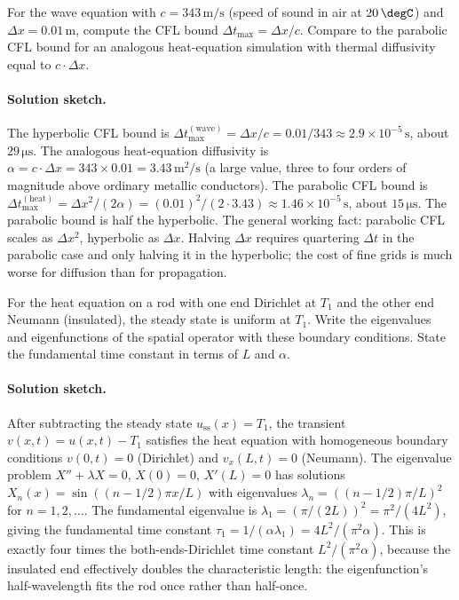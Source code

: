 \begin{exercise}
For the wave equation with $c = 343\,\si{\meter\per\second}$
(speed of sound in air at $20\,\degC$) and $\Delta x = 0.01\,\si
{\meter}$, compute the CFL bound $\Delta t_{\max} = \Delta x/c$.
Compare to the parabolic CFL bound for an analogous heat-equation
simulation with thermal diffusivity equal to $c \cdot \Delta x$.

\paragraph{Solution sketch.}
The hyperbolic CFL bound is $\Delta t_{\max}^{(\text{wave})} =
\Delta x / c = 0.01/343 \approx 2.9 \times 10^{-5}\,\si{\second}$,
about $29\,\si{\micro\second}$. The analogous heat-equation
diffusivity is $\alpha = c \cdot \Delta x = 343 \times 0.01 =
3.43\,\si{\meter\squared\per\second}$ (a large value, three to
four orders of magnitude above ordinary metallic conductors).
The parabolic CFL bound is $\Delta t_{\max}^{(\text{heat})} =
\Delta x^{2}/(2\alpha) = (0.01)^{2}/(2 \cdot 3.43) \approx
1.46 \times 10^{-5}\,\si{\second}$, about $15\,\si{\micro\second}$.
The parabolic bound is half the hyperbolic. The general working
fact: parabolic CFL scales as $\Delta x^{2}$, hyperbolic as
$\Delta x$. Halving $\Delta x$ requires quartering $\Delta t$ in
the parabolic case and only halving it in the hyperbolic; the
cost of fine grids is much worse for diffusion than for
propagation.
\end{exercise}

\begin{exercise}
For the heat equation on a rod with one end Dirichlet at $T_{1}$
and the other end Neumann (insulated), the steady state is
uniform at $T_{1}$. Write the eigenvalues and eigenfunctions of
the spatial operator with these boundary conditions. State the
fundamental time constant in terms of $L$ and $\alpha$.

\paragraph{Solution sketch.}
After subtracting the steady state $u_{\text{ss}}(x) = T_{1}$,
the transient $v(x, t) = u(x, t) - T_{1}$ satisfies the heat
equation with homogeneous boundary conditions $v(0, t) = 0$
(Dirichlet) and $v_{x}(L, t) = 0$ (Neumann). The eigenvalue
problem $X'' + \lambda X = 0$, $X(0) = 0$, $X'(L) = 0$ has
solutions $X_{n}(x) = \sin((n - 1/2)\pi x/L)$ with eigenvalues
$\lambda_{n} = ((n - 1/2)\pi/L)^{2}$ for $n = 1, 2, \ldots$. The
fundamental eigenvalue is $\lambda_{1} = (\pi/(2L))^{2} =
\pi^{2}/(4 L^{2})$, giving the fundamental time constant
$\tau_{1} = 1/(\alpha \lambda_{1}) = 4 L^{2}/(\pi^{2} \alpha)$.
This is exactly four times the both-ends-Dirichlet time constant
$L^{2}/(\pi^{2}\alpha)$, because the insulated end effectively
doubles the characteristic length: the eigenfunction's
half-wavelength fits the rod once rather than half-once.
\end{exercise}

